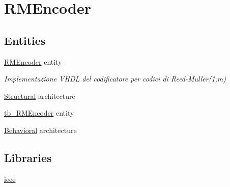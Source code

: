 \hypertarget{group___r_m_encoder}{\section{R\+M\+Encoder}
\label{group___r_m_encoder}
}
\subsection*{Entities}
\begin{DoxyCompactItemize}
\item 
\hyperlink{class_r_m_encoder}{R\+M\+Encoder} entity
\begin{DoxyCompactList}\small\item\em Implementazione V\+H\+D\+L del codificatore per codici di Reed-\/\+Muller(1,m) \end{DoxyCompactList}\item 
\hyperlink{class_r_m_encoder_1_1_structural}{Structural} architecture
\item 
\hyperlink{classtb___r_m_encoder}{tb\+\_\+\+R\+M\+Encoder} entity
\item 
\hyperlink{classtb___r_m_encoder_1_1_behavioral}{Behavioral} architecture
\end{DoxyCompactItemize}
\subsection*{Libraries}
 \begin{DoxyCompactItemize}
\item 
\hypertarget{group___r_m_encoder_ga0a6af6eef40212dbaf130d57ce711256}{\hyperlink{group___r_m_encoder_ga0a6af6eef40212dbaf130d57ce711256}{ieee} }\label{group___r_m_encoder_ga0a6af6eef40212dbaf130d57ce711256}

\end{DoxyCompactItemize}
